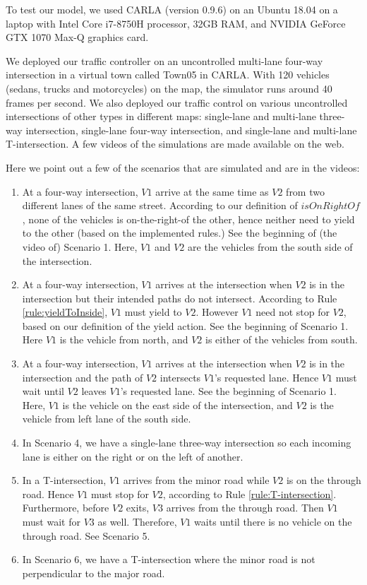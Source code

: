 To test our model,
we used CARLA (version 0.9.6) on an Ubuntu 18.04 on
a laptop with Intel Core i7-8750H processor,
32GB RAM, and 
NVIDIA GeForce GTX 1070 Max-Q graphics card.

We deployed our traffic controller on
an uncontrolled multi-lane four-way intersection in a virtual town called Town05 in CARLA.
With 120 vehicles (sedans, trucks and motorcycles) on the map,
the simulator runs around 40 frames per second.
We also deployed our traffic control on
various uncontrolled intersections of other types in different maps:
single-lane and multi-lane three-way intersection,
single-lane four-way intersection, and
single-lane and multi-lane T-intersection.
A few videos of the simulations are made available on the web.%

Here we point out a few of the scenarios that are simulated and are in the videos:

\begin{enumerate}
    \item 
    At a four-way intersection,
    $V1$ arrive at the same time as $V2$ from two different lanes of the same street.
    According to our definition of $isOnRightOf$,
    none of the vehicles is on-the-right-of the other,
    hence neither need to yield to the other
    (based on the implemented rules.)
    See the beginning of (the video of) Scenario 1.
    Here,
    $V1$ and $V2$ are the vehicles from the south side of the intersection.
    \item
    At a four-way intersection,
    $V1$ arrives at the intersection when $V2$ is in the intersection
    but their intended paths do not intersect.
    According to Rule \ref{rule:yieldToInside},
    $V1$ must yield to $V2$.
    However $V1$ need not stop for $V2$,
    based on our definition of the yield action.
    See the beginning of Scenario 1.
    Here $V1$ is the vehicle from north, and
    $V2$ is either of the vehicles from south.
    \item
    At a four-way intersection,
    $V1$ arrives at the intersection when $V2$ is in the intersection
    and the path of $V2$ intersects $V1$'s requested lane.
    Hence $V1$ must wait until $V2$ leaves $V1$'s requested lane.
    See the beginning of Scenario 1.
    Here,
    $V1$ is the vehicle on the east side of the intersection, and
    $V2$ is the vehicle from left lane of the south side.
    \item
    In Scenario 4,
    we have a single-lane three-way intersection
    so each incoming lane is either on the right or on the left of another.
    \item
    In a T-intersection,
    $V1$ arrives from the minor road while $V2$ is on the through road.
    Hence $V1$ must stop for $V2$,
    according to Rule \ref{rule:T-intersection}.
    Furthermore,
    before $V2$ exits,
    $V3$ arrives from the through road.
    Then $V1$ must wait for $V3$ as well.
    Therefore,
    $V1$ waits until there is no vehicle on the through road.
    See Scenario 5.
    \item
    In Scenario 6,
    we have a T-intersection where
    the minor road is not perpendicular to the major road.
\end{enumerate}


